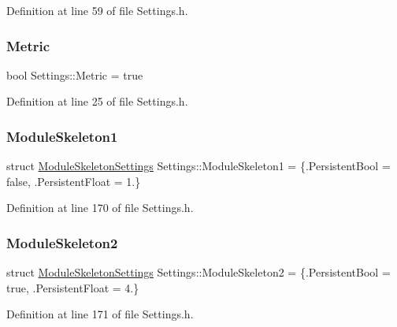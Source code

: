 Definition at line 59 of file Settings.\+h.

\mbox{\label{struct_settings_aaa7eb601917b369479553ede68e16581}} 
\subsubsection{\texorpdfstring{Metric}{Metric}}
{\footnotesize\ttfamily bool Settings\+::\+Metric = true}



Definition at line 25 of file Settings.\+h.

\mbox{\label{struct_settings_a74935720d208940141e63f288208c648}} 
\subsubsection{\texorpdfstring{Module\+Skeleton1}{ModuleSkeleton1}}
{\footnotesize\ttfamily struct \hyperlink{struct_settings_1_1_module_skeleton_settings}{Module\+Skeleton\+Settings} Settings\+::\+Module\+Skeleton1 = \{.Persistent\+Bool = false, .Persistent\+Float = 1.\}}



Definition at line 170 of file Settings.\+h.

\mbox{\label{struct_settings_a36f14dc8de6e5472163be758a77121e3}} 
\subsubsection{\texorpdfstring{Module\+Skeleton2}{ModuleSkeleton2}}
{\footnotesize\ttfamily struct \hyperlink{struct_settings_1_1_module_skeleton_settings}{Module\+Skeleton\+Settings} Settings\+::\+Module\+Skeleton2 = \{.Persistent\+Bool = true, .Persistent\+Float = 4.\}}



Definition at line 171 of file Settings.\+h.

\mbox{\label{struct_settings_aef8cfb16058705f136a43edae7657165}} 
